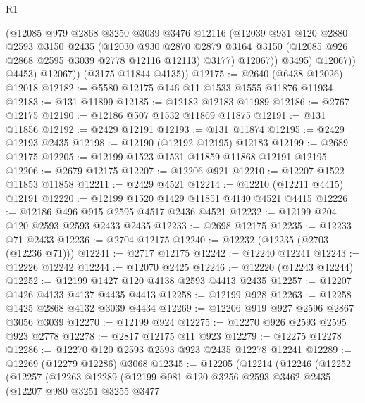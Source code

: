\begin{lexlean}{R1}
\begin{coremodule}
                  (@12085
                    @979
                    @2868
                    @3250
                    @3039
                    @3476
                    @12116
                    (@12039
                      @931
                      @120
                      @2880
                      @2593
                      @3150
                      @2435
                      (@12030
                        @930
                        @2870
                        @2879
                        @3164
                        @3150
                        (@12085 @926 @2868 @2595 @3039 @2778 @12116 @12113)
                        @3177)
                      @12067))
                  @3495)
                @12067))
            @4453)
          @12067))
      (@3175 @11844 @4135))
@12175 := @2640 (@6438 @12026) @12018
@12182 := @5580 @12175 @146 @11 @1533 @1555 @11876 @11934
@12183 := @131 @11899
@12185 := @12182 @12183 @11989
@12186 := @2767 @12175
@12190 := @12186 @507 @1532 @11869 @11875
@12191 := @131 @11856
@12192 := @2429 @12191
@12193 := @131 @11874
@12195 := @2429 @12193 @2435
@12198 := @12190 (@12192 @12195) @12183
@12199 := @2689 @12175
@12205 := @12199 @1523 @1531 @11859 @11868 @12191 @12195
@12206 := @2679 @12175
@12207 := @12206 @921
@12210 := @12207 @1522 @11853 @11858
@12211 := @2429 @4521
@12214 := @12210 (@12211 @4415) @12191
@12220 := @12199 @1520 @1429 @11851 @4140 @4521 @4415
@12226 := @12186 @496 @915 @2595 @4517 @2436 @4521
@12232 := @12199 @204 @120 @2593 @2593 @2433 @2435
@12233 := @2698 @12175
@12235 := @12233 @71 @2433
@12236 := @2704 @12175
@12240 := @12232 (@12235 (@2703 (@12236 @71)))
@12241 := @2717 @12175
@12242 := @12240 @12241
@12243 := @12226 @12242
@12244 := @12070 @2425
@12246 := @12220 (@12243 @12244)
@12252 := @12199 @1427 @120 @4138 @2593 @4413 @2435
@12257 := @12207 @1426 @4133 @4137 @4435 @4413
@12258 := @12199 @928
@12263 := @12258 @1425 @2868 @4132 @3039 @4434
@12269 := @12206 @919 @927 @2596 @2867 @3056 @3039
@12270 := @12199 @924
@12275 := @12270 @926 @2593 @2595 @923 @2778
@12278 := @2817 @12175 @11 @923
@12279 := @12275 @12278
@12286 := @12270 @120 @2593 @2593 @923 @2435 @12278 @12241
@12289 := @12269 (@12279 @12286) @3068
@12345 := @12205
    (@12214
      (@12246
        (@12252
          (@12257
            (@12263
              @12289
              (@12199
                @981
                @120
                @3256
                @2593
                @3462
                @2435
                (@12207
                  @980
                  @3251
                  @3255
                  @3477

\end{coremodule}
\end{lexlean}
